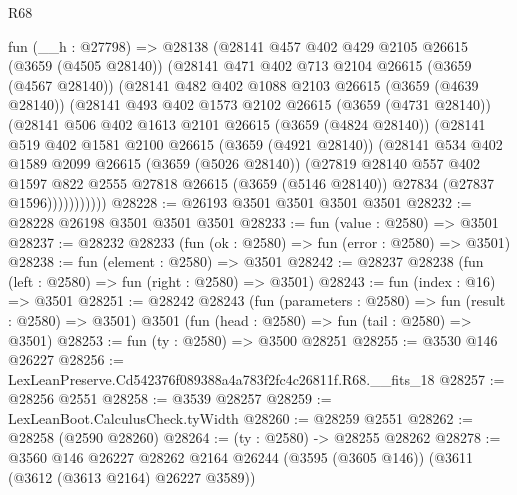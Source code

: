 \begin{lexlean}{R68}
\begin{coremodule}
      fun (__h : @27798) =>
      @28138
        (@28141
          @457
          @402
          @429
          @2105
          @26615
          (@3659 (@4505 @28140))
          (@28141
            @471
            @402
            @713
            @2104
            @26615
            (@3659 (@4567 @28140))
            (@28141
              @482
              @402
              @1088
              @2103
              @26615
              (@3659 (@4639 @28140))
              (@28141
                @493
                @402
                @1573
                @2102
                @26615
                (@3659 (@4731 @28140))
                (@28141
                  @506
                  @402
                  @1613
                  @2101
                  @26615
                  (@3659 (@4824 @28140))
                  (@28141
                    @519
                    @402
                    @1581
                    @2100
                    @26615
                    (@3659 (@4921 @28140))
                    (@28141
                      @534
                      @402
                      @1589
                      @2099
                      @26615
                      (@3659 (@5026 @28140))
                      (@27819
                        @28140
                        @557
                        @402
                        @1597
                        @822
                        @2555
                        @27818
                        @26615
                        (@3659 (@5146 @28140))
                        @27834
                        (@27837 @1596)))))))))))
@28228 := @26193 @3501 @3501 @3501 @3501
@28232 := @28228 @26198 @3501 @3501 @3501
@28233 := fun (value : @2580) => @3501
@28237 := @28232 @28233 (fun (ok : @2580) => fun (error : @2580) => @3501)
@28238 := fun (element : @2580) => @3501
@28242 := @28237 @28238 (fun (left : @2580) => fun (right : @2580) => @3501)
@28243 := fun (index : @16) => @3501
@28251 := @28242
    @28243
    (fun (parameters : @2580) => fun (result : @2580) => @3501)
    @3501
    (fun (head : @2580) => fun (tail : @2580) => @3501)
@28253 := fun (ty : @2580) => @3500 @28251
@28255 := @3530 @146 @26227
@28256 := LexLeanPreserve.Cd542376f089388a4a783f2fc4c26811f.R68.__fits_18
@28257 := @28256 @2551
@28258 := @3539 @28257
@28259 := LexLeanBoot.CalculusCheck.tyWidth
@28260 := @28259 @2551
@28262 := @28258 (@2590 @28260)
@28264 := (ty : @2580) -> @28255 @28262
@28278 := @3560
    @146
    @26227
    @28262
    @2164
    @26244
    (@3595 (@3605 @146))
    (@3611 (@3612 (@3613 @2164) @26227 @3589))

\end{coremodule}
\end{lexlean}
